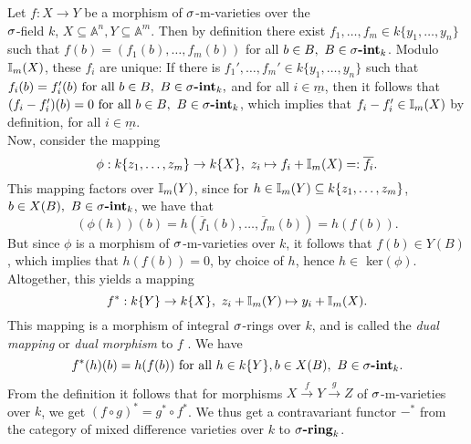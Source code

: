 \begin{rem}\label{dualmor}
Let $f: X \rightarrow Y$ be a morphism of $\sigma$-m-varieties over the \\ $\sigma$-field $k$, $X \subseteq \mathbb{A}^n, Y \subseteq \mathbb{A}^m$. Then by definition there exist $f_1, \ldots, f_m \in k\{y_1,\ldots,y_n\}$ such 
that $f(b) = (f_1(b),\ldots,f_m(b))$ for all $b \in B, ~ B \in \sigma\text{{\normalfont\textbf{-int}}}_k$. Modulo $\mathbb{I}_m(X)$, these $f_i$ are unique:
 If there is $f_1', \ldots, f_m' \in k\{y_1,\ldots,y_n\}$ such that $f_i(b) = f'_i(b) \text{ for all } b \in B, ~ B \in \sigma\text{{\normalfont\textbf{-int}}}_k,$ and for all $i \in \underline{m}$,
then it follows that $(f_i - f_i')(b) = 0 \text{ for all } b \in B, ~ B \in \sigma\text{{\normalfont\textbf{-int}}}_k$, which implies that $f_i - f_i' \in \mathbb{I}_m(X)$ by definition, for all $i \in \underline{m}$. \\
\indent Now, consider the mapping \[ \phi: k\{z_1,\ldots,z_m \} \rightarrow k\{X\}, ~ z_i \mapsto f_i + \mathbb{I}_m(X) =: \overline{f_i}. \]
This mapping factors over $\mathbb{I}_m(Y)$, since for $h \in \mathbb{I}_m(Y) \subseteq k\{z_1,\ldots,z_m\}$, $b \in X(B), ~ B \in \sigma\text{{\normalfont\textbf{-int}}}_k$, we have that 
\[ (\phi(h))(b) = h(\overline f_1(b), \ldots, \overline f_m(b)) = h(f(b)). \]
But since $\phi$ is a morphism of $\sigma$-m-varieties over $k$, it follows that $f(b) \in Y(B)$, which implies that $h(f(b)) = 0$, by choice of $h$, hence $h \in $ ker$(\phi)$.
Altogether, this yields a mapping 
\[ f^* : k\{Y\} \rightarrow k\{X\}, ~ z_i + \mathbb{I}_m(Y) \mapsto y_i + \mathbb{I}_m(X). \]
This mapping is a morphism of integral $\sigma$-rings over $k$, and is called the \emph{dual mapping} or \emph{dual morphism} to $f$ . We have
\[ f^*(h)(b) = h(f(b)) \text{ for all } h \in k\{Y\}, b \in X(B), ~ B \in \sigma\text{{\normalfont\textbf{-int}}}_k. \]
From the definition it follows that for morphisms $X \xrightarrow{f} Y \xrightarrow{g} Z$ of $\sigma$-m-varieties over $k$, we get $ (f \circ g)^* = g^* \circ f^*$. 
We thus get a contravariant functor $-^*$ from the category of mixed difference varieties over $k$ to $\sigma\text{{\normalfont\textbf{-ring}}}_k$.
\end{rem}

